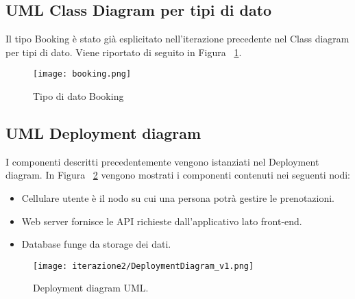 \subsection{UML Class Diagram per tipi di dato}
Il tipo Booking è stato già esplicitato nell'iterazione precedente nel Class diagram per tipi di dato.
Viene riportato di seguito in Figura ~\ref{fig:BookingType}.

\begin{figure}[htbp]
    \texttt{[image: booking.png]}
    \centering
    \caption{Tipo di dato Booking}\label{fig:BookingType}
\end{figure}

\subsection{UML Deployment diagram}
I componenti descritti precedentemente vengono istanziati nel Deployment diagram.
In Figura ~\ref{fig:DeploymentDiagram2} vengono mostrati i componenti contenuti nei seguenti nodi:
\begin{itemize}
    \item Cellulare utente è il nodo su cui una persona potrà gestire le prenotazioni.
    \item Web server fornisce le API richieste dall’applicativo lato front-end.
    \item Database funge da storage dei dati.
\end{itemize}

\begin{figure}[htbp]
    \texttt{[image: iterazione2/DeploymentDiagram\_v1.png]}
    \centering
    \caption{Deployment diagram UML.}\label{fig:DeploymentDiagram2}
\end{figure}